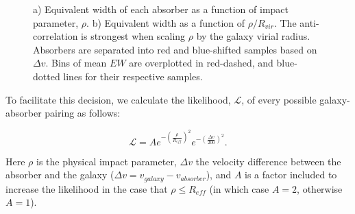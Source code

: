 \documentclass[twocolumn,tighten]{aastex6}
\begin{document}
\begin{figure}[t]
\centering
{}
\caption{\small{a) Equivalent width of each absorber as a function of impact parameter, $\rho$. b) Equivalent width as a function of $\rho/R_{vir}$. The anti-correlation is strongest when scaling $\rho$ by the galaxy virial radius. Absorbers are separated into red and blue-shifted samples based on $\Delta v$. Bins of mean $EW$ are overplotted in red-dashed, and blue-dotted lines for their respective samples.}}
\vspace{5pt}
\end{figure}


To facilitate this decision, we calculate the likelihood, $\mathcal{L}$, of every possible galaxy-absorber pairing as follows:

\begin{equation}
	\mathcal{L} = A e^{-(\frac{\rho}{R_{eff}})^2} e^{-(\frac{\Delta v}{200})^2}.
\end{equation}

\noindent Here $\rho$ is the physical impact parameter, $\Delta v$ the velocity difference between the absorber and the galaxy ($\Delta v = v_{galaxy} - v_{absorber}$), and $A$ is a factor included to increase the likelihood in the case that $\rho \leq R_{eff}$ (in which case $A = 2$, otherwise $A = 1$). 
\end{document}
